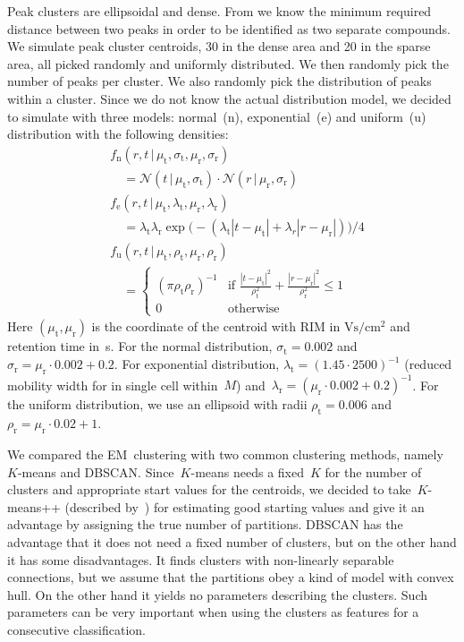\documentclass{article}
\newcommand{\given}{\,|\,}
\begin{document}
Peak clusters are ellipsoidal and dense.
From \cite{bodeker2008peak} we know the minimum required distance between two peaks in order to be identified as two separate compounds.
We simulate peak cluster centroids, 30 in the dense area and 20 in the sparse area, all picked randomly and uniformly distributed.
We then randomly pick the number of peaks per cluster.
We also randomly pick the distribution of peaks within a cluster.
Since we do not know the actual distribution model, we decided to simulate with three models: normal~(n), exponential~(e) and uniform~(u) distribution with the following densities:
\begin{align*}
 & f_{\text{n}}(r, t \given \mu_\text{t}, \sigma_\text{t}, \mu_\text{r}, \sigma_\text{r}) \\
 &\quad = \mathcal{N}(t \given \mu_\text{t}, \sigma_\text{t}) \cdot \mathcal{N}(r \given \mu_\text{r}, \sigma_\text{r}) \\
& f_{\text{e}}(r, t \given \mu_\text{t}, \lambda_\text{t}, \mu_\text{r}, \lambda_\text{r}) \\
 &\quad = \lambda_\text{t} \lambda_\text{r} \exp \big(- (\lambda_\text{t} |t-\mu_\text{t}| + \lambda_r |r-\mu_\text{r}|) \big) / 4 \\
& f_{\text{u}}(r, t \given  \mu_\text{t}, \rho_\text{t},  \mu_\text{r}, \rho_\text{r}) \\
 &\quad = \begin{cases}
     (\pi \rho_\text{t} \rho_\text{r} )^{-1} & \text{if } \frac{|t-\mu_\text{t}|^2}{\rho_\text{t}^2} + \frac{|r-\mu_\text{r}|^2}{\rho_\text{r}^2} \leq 1 \\
     0 & \text{otherwise}
     \end{cases}
\end{align*}
Here $(\mu_\text{t}, \mu_\text{r})$ is the coordinate of the centroid with RIM in $\text{Vs}/\text{cm}^2$ and retention time in~s.
For the normal distribution, $\sigma_{\text{t}}=0.002$ and $\sigma_{\text{r}}=\mu_\text{r} \cdot 0.002 + 0.2$.
For exponential distribution, $\lambda_{\text{t}} = (1.45 \cdot 2500)^{-1}$ (reduced mobility width for in single cell within~$M$) and~$\lambda_{\text{r}} = (\mu_\text{r} \cdot 0.002 + 0.2)^{-1}$.
For the uniform distribution, we use an ellipsoid with radii $\rho_{\text{t}} = 0.006$ and $\rho_{\text{r}} = \mu_\text{r} \cdot 0.02 + 1$.

We compared the EM~clustering with two common clustering methods, namely~$K$-means and DBSCAN.
Since~$K$-means needs a fixed~$K$ for the number of clusters and appropriate start values for the centroids, we decided to take~$K$-means++ (described by~\cite{arthur/etal/2007}) for estimating good starting values and give it an advantage by assigning the true number of partitions.
DBSCAN has the advantage that it does not need a fixed number of clusters, but on the other hand it has some disadvantages.
It finds clusters with non-linearly separable connections, but we assume that the partitions obey a kind of model with convex hull.
On the other hand it yields no parameters describing the clusters.
Such parameters can be very important when using the clusters as features for a consecutive classification.
\end{document}
